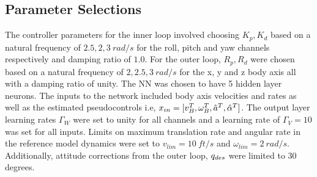 \subsection{Parameter Selections}
The controller parameters for the inner loop involved choosing $K_p,
K_d$ based on a natural frequency of $2.5, 2, 3\ rad/s$ for the
roll, pitch and yaw channels respectively and damping ratio of
$1.0$. For the outer loop, $R_p, R_d$ were chosen based on a natural
frequency of $2, 2.5, 3\ rad/s$ for the x, y and z body axis all
with a damping ratio of unity. The NN was chosen to have 5 hidden
layer neurons. The inputs to the network included body axis
velocities and rates as well as the estimated pseudocontrols i.e,
$x_{in} = [v_B^T, \omega_B^T, \hat{a}^T, \hat{\alpha}^T]$. The
output layer learning rates $\Gamma_W$ were
set to unity for all channels and a learning rate of $\Gamma_V = 10$
was set for all inputs. Limits on maximum translation rate and
angular rate in the reference model dynamics were set to $v_{lim} =
10\ ft/s$ and $\omega_{lim} = 2\ rad/s$. Additionally, attitude
corrections from the outer loop, $q_{des}$ were limited to $30$
degrees.


